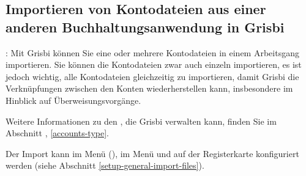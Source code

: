 \subsection{Importieren von Kontodateien aus einer anderen Buchhaltungsanwendung in Grisbi\label{importexport-import-importinit}}

\Note{}: Mit Grisbi können Sie eine oder mehrere Kontodateien in einem Arbeitsgang importieren. Sie können die Kontodateien zwar auch einzeln importieren, es ist jedoch wichtig, alle Kontodateien gleichzeitig zu importieren, damit Grisbi die Verknüpfungen zwischen den Konten wiederherstellen kann, insbesondere im Hinblick auf Überweisungsvorgänge.

Weitere Informationen zu den , die Grisbi verwalten kann, finden Sie im Abschnitt , \vref{accounts-type}.


Der Import kann im Menü  (), im Menü  und auf der Registerkarte  konfiguriert werden (siehe Abschnitt \vref{setup-general-import-files}).

